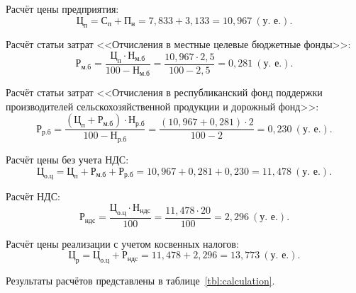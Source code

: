 Расчёт цены предприятия:
\begin{equation*}
\text{Ц}_{\text{п}} = 
\text{С}_{\text{п}} + \text{П}_{\text{н}} =
7{,}833 + 3{,}133 =
10{,}967 \: (\text{у.~е.}).
\end{equation*}

Расчёт статьи затрат 
<<Отчисления в местные целевые бюджетные фонды>>:
\begin{equation*}
\text{Р}_{\text{м.б}} = 
\dfrac{
  \text{Ц}_{\text{п}} \cdot \text{Н}_{\text{м.б}}
}{
  100 - \text{Н}_{\text{м.б}}
} =
\dfrac{10{,}967 \cdot 2{,}5 }{100 - 2{,}5}  =
0{,}281 \: (\text{у.~е.}).
\end{equation*}

Расчёт статьи затрат 
<<Отчисления в республиканский фонд поддержки производителей
сельскохозяйственной продукции и дорожный фонд>>:
\begin{equation*}
\text{Р}_{\text{р.б}} = 
\dfrac{
  (\text{Ц}_{\text{п}} + \text{Р}_{\text{м.б}}) \cdot \text{Н}_{\text{р.б}}
}{
  100 - \text{Н}_{\text{р.б}}
} =
\dfrac{(10{,}967 + 0{,}281) \cdot 2}{100 - 2} =
0{,}230 \: (\text{у.~е.}).
\end{equation*}

Расчёт цены без учета НДС:
\begin{equation*}
\text{Ц}_{\text{о.ц}} = 
\text{Ц}_{\text{п}} + \text{Р}_{\text{м.б}} + \text{Р}_{\text{р.б}} = 
10{,}967 + 0{,}281 + 0{,}230 =
11{,}478 \: (\text{у.~е.}).
\end{equation*}

Расчёт НДС:
\begin{equation*}
\text{Р}_{\text{ндс}} = 
\dfrac{
  \text{Ц}_{\text{о.ц}} \cdot \text{Н}_{\text{ндс}}
}{
  100
} =
\dfrac{11{,}478 \cdot 20}{100}  =
2{,}296 \: (\text{у.~е.}).
\end{equation*}

Расчёт цены реализации с учетом косвенных налогов:
\begin{equation*}
\text{Ц}_{\text{р}} = 
\text{Ц}_{\text{о.ц}} + \text{Р}_{\text{ндс}} =
11{,}478 + 2{,}296 = 
13{,}773 \: (\text{у.~е.}).
\end{equation*}

Результаты расчётов представлены в таблице~\ref{tbl:calculation}.

